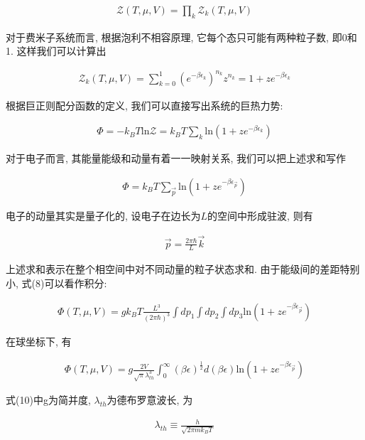 \documentclass[a4paper, 12pt, notitlepage]{article}
\begin{document}
\begin{align}
	\mathcal{Z}(T, \mu, V) = \prod_k \mathcal{Z}_k(T, \mu, V)
\end{align}

	对于费米子系统而言, 根据泡利不相容原理, 它每个态只可能有两种粒子数, 即0和1. 这样我们可以计算出
	
\begin{align}
	\mathcal{Z}_k(T, \mu, V) = \sum_{k = 0}^1 (e^{-\beta \epsilon_k})^{n_k} z ^ {n_k} = 1 + ze^{-\beta \epsilon_k}
\end{align}

	根据巨正则配分函数的定义, 我们可以直接写出系统的巨热力势:
	
\begin{align}
	\Phi = -k_B T\textrm{ln} \mathcal{Z} = k_B T\sum_k \textrm{ln}(1+ze^{-\beta \epsilon_k})
\end{align}

	对于电子而言, 其能量能级和动量有着一一映射关系, 我们可以把上述求和写作
	
\begin{align}
	\Phi = k_B T\sum_{\vec{p}} \textrm{ln}(1+ze^{-\beta \epsilon_{\vec{p}}})
\end{align}

	电子的动量其实是量子化的, 设电子在边长为$L$的空间中形成驻波, 则有
	
\begin{align*}
	\vec{p} = \frac{2\pi \hbar}{L} \vec{k}
\end{align*}
	
	上述求和表示在整个相空间中对不同动量的粒子状态求和. 由于能级间的差距特别小, 式(8)可以看作积分:
	
\begin{align*}
	\Phi(T, \mu, V) = gk_B T \frac{L^3}{(2\pi\hbar)^3}\int dp_1 \int dp_2 \int dp_3 \textrm{ln}(1+ze^{-\beta \epsilon_{\vec{p}}})
\end{align*}

	在球坐标下, 有
	
\begin{align}
	\Phi(T, \mu, V)  = g\frac{2V}{\sqrt{\pi}\lambda_{th}^3}\int^\infty_0 (\beta \epsilon)^\frac{1}{2} d(\beta \epsilon) \textrm{ln}(1+ze^{-\beta \epsilon_{\vec{p}}})
\end{align}

	式(10)中g为简并度, $\lambda_{th}$为德布罗意波长, 为
	
\begin{align*}
	\lambda_{th} \equiv \frac{h}{\sqrt{2\pi m k_B T}}
\end{align*}
\end{document}

